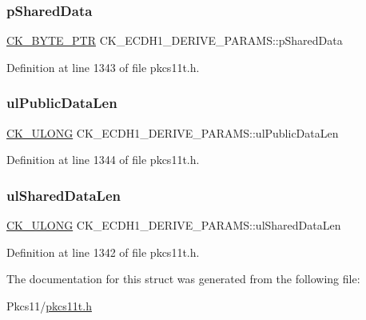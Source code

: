 \subsubsection{\texorpdfstring{p\+Shared\+Data}{pSharedData}}
{\footnotesize\ttfamily \hyperlink{pkcs11t_8h_a3d7233a4077fbaf7ae76b64da0a62a21}{C\+K\+\_\+\+B\+Y\+T\+E\+\_\+\+P\+TR} C\+K\+\_\+\+E\+C\+D\+H1\+\_\+\+D\+E\+R\+I\+V\+E\+\_\+\+P\+A\+R\+A\+M\+S\+::p\+Shared\+Data}



Definition at line 1343 of file pkcs11t.\+h.

\mbox{\label{struct_c_k___e_c_d_h1___d_e_r_i_v_e___p_a_r_a_m_s_af06ac27a02189f096fd840e0e27e58c4}} 
\subsubsection{\texorpdfstring{ul\+Public\+Data\+Len}{ulPublicDataLen}}
{\footnotesize\ttfamily \hyperlink{pkcs11t_8h_a35181858a3b7a0a81f49d180d8f446ef}{C\+K\+\_\+\+U\+L\+O\+NG} C\+K\+\_\+\+E\+C\+D\+H1\+\_\+\+D\+E\+R\+I\+V\+E\+\_\+\+P\+A\+R\+A\+M\+S\+::ul\+Public\+Data\+Len}



Definition at line 1344 of file pkcs11t.\+h.

\mbox{\label{struct_c_k___e_c_d_h1___d_e_r_i_v_e___p_a_r_a_m_s_a02d6c1c7d1eef23185b8724d2747ed99}} 
\subsubsection{\texorpdfstring{ul\+Shared\+Data\+Len}{ulSharedDataLen}}
{\footnotesize\ttfamily \hyperlink{pkcs11t_8h_a35181858a3b7a0a81f49d180d8f446ef}{C\+K\+\_\+\+U\+L\+O\+NG} C\+K\+\_\+\+E\+C\+D\+H1\+\_\+\+D\+E\+R\+I\+V\+E\+\_\+\+P\+A\+R\+A\+M\+S\+::ul\+Shared\+Data\+Len}



Definition at line 1342 of file pkcs11t.\+h.



The documentation for this struct was generated from the following file\+:\begin{DoxyCompactItemize}
\item 
Pkcs11/\hyperlink{pkcs11t_8h}{pkcs11t.\+h}\end{DoxyCompactItemize}
